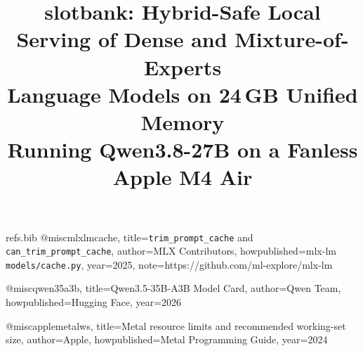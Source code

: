 \begin{filecontents*}[overwrite]{refs.bib}
@misc{mlxlmcache,
  title={\texttt{trim\_prompt\_cache} and \texttt{can\_trim\_prompt\_cache}},
  author={{MLX Contributors}},
  howpublished={mlx-lm \texttt{models/cache.py}},
  year={2025},
  note={https://github.com/ml-explore/mlx-lm}
}

@misc{qwen35a3b,
  title={{Qwen3.5-35B-A3B} Model Card},
  author={{Qwen Team}},
  howpublished={Hugging Face},
  year={2026}
}

@misc{applemetalws,
  title={{Metal} resource limits and recommended working-set size},
  author={{Apple}},
  howpublished={Metal Programming Guide},
  year={2024}
}
\end{filecontents*}

\documentclass[11pt]{article}

\usepackage[margin=1in]{geometry}
\usepackage{times}
\usepackage{amsmath,amssymb,amsthm}
\usepackage{booktabs}
\usepackage{graphicx}
\usepackage{xcolor}
\usepackage{tikz}
\usetikzlibrary{arrows.meta,positioning,fit,calc,shapes.geometric,patterns}
\usepackage{algorithm}
\usepackage{algpseudocode}
\usepackage{hyperref}
\usepackage{natbib}
\usepackage{enumitem}
\usepackage{caption}
\usepackage{subcaption}
\usepackage{titlesec}
\usepackage{fancyhdr}
\usepackage{microtype}
\usepackage{url}
\usepackage{setspace}
\usepackage{longtable}
\usepackage{array}
\usepackage{multirow}


\pagestyle{fancy}
\fancyhf{}
\fancyfoot[C]{\thepage}
\renewcommand{\headrulewidth}{0.4pt}

\theoremstyle{definition}
\newtheorem{definition}{Definition}
\newtheorem{proposition}{Proposition}
\newtheorem{remark}{Remark}

\newcommand{\slotbank}{\textsc{slotbank}}
\newcommand{\gdn}{Gated DeltaNet}
\newcommand{\tokspersec}{\mathrm{tok/s}}

\title{\vspace{-1.2em}
\textbf{slotbank}: Hybrid-Safe Local Serving of Dense and Mixture-of-Experts\\
Language Models on 24\,GB Unified Memory\\[0.4em]
\large Running Qwen3.8-27B on a Fanless Apple M4 Air}

